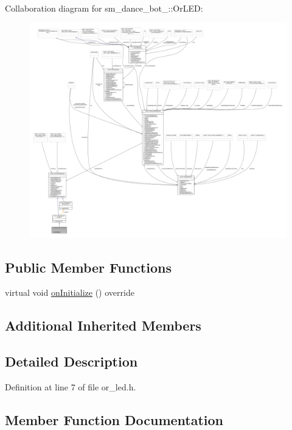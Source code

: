 Collaboration diagram for sm\+\_\+dance\+\_\+bot\+\_\+:\+:Or\+L\+ED\+:
\nopagebreak
\begin{figure}[H]
\begin{center}
\leavevmode
\includegraphics[width=350pt]{classsm__dance__bot__3_1_1OrLED__coll__graph}
\end{center}
\end{figure}
\subsection*{Public Member Functions}
\begin{DoxyCompactItemize}
\item 
virtual void \hyperlink{classsm__dance__bot__3_1_1OrLED_ac59cd78e554907661f9c24d141d316bc}{on\+Initialize} () override
\end{DoxyCompactItemize}
\subsection*{Additional Inherited Members}


\subsection{Detailed Description}


Definition at line 7 of file or\+\_\+led.\+h.



\subsection{Member Function Documentation}
